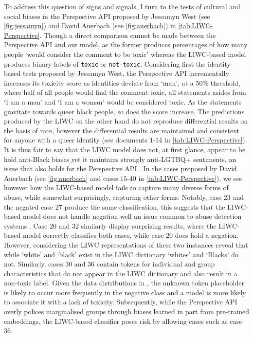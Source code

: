 To address this question of signs and signals, I turn to the tests of cultural and social biases in the Perspective API proposed by Jessamyn West (see \autoref{fig:jessamyn}) and David Auerbach (see \autoref{fig:auerbach}) in \autoref{tab:LIWC-Perspective}. Though a direct comparison cannot be made between the Perspective API and our model, as the former produces percentages of how many people `would consider the comment to be toxic' \citep{Perspective:Github} whereas the LIWC-based model produces binary labels of \texttt{toxic} or \texttt{not-toxic}. Considering first the identity-based tests proposed by Jessamyn West, the Perspective API incrementally increases its toxicity score as identities deviate from `man', at a $50\%$ threshold, where half of all people would find the comment toxic, all statements asides from `I am a man' and `I am a woman' would be considered toxic. As the statements gravitate towards queer black people, so does the score increase. The predictions produced by the LIWC on the other hand do not reproduce differential results on the basis of race, however the differential results are maintained and consistent for anyone with a queer identity (see documents $1$-$14$ in \autoref{tab:LIWC-Perspective}). It is thus fair to say that the LIWC model does not, at first glance, appear to be hold anti-Black biases yet it maintains strongly anti-LGTBQ+ sentiments, an issue that also holds for the Perspective API \citep{Dias:2021}. In the cases proposed by David Auerbach (see \autoref{fig:auerbach} and cases $15$-$40$ in \autoref{tab:LIWC-Perspective}), we see however how the LIWC-based model fails to capture many diverse forms of abuse, while somewhat surprisingly, capturing other forms. Notably, case $23$ and the negated case $27$ produce the same classification, this suggests that the LIWC-based model does not handle negation well an issue common to abuse detection systems \cite{Rottger:2021}. Case $20$ and $32$ similarly display surprising results, where the LIWC-based model correctly classifies both cases, while case $20$ does hold a negation. However, considering the LIWC representations of these two instances reveal that while `white' and `black' exist in the LIWC dictionary `whites' and `Blacks' do not. Similarly, cases $30$ and $36$ contain tokens for individual and group characteristics that do not appear in the LIWC dictionary and also result in a non-toxic label. Given the data distributions in \citet{Wulczyn:2017}, the unknown token placeholder is likely to occur more frequently in the negative class and a model is more likely to associate it with a lack of toxicity. Subsequently, while the Perspective API overly polices marginalised groups through biases learned in part from pre-trained embeddings, the LIWC-based classifier poses risk by allowing cases such as case $36$.

